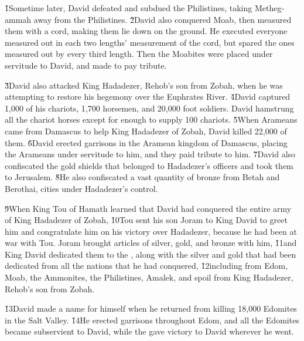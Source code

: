 \v{1}Sometime later, David defeated and subdued the Philistines, taking Metheg-ammah away from the Philistines. \v{2}David also conquered Moab, then measured them with a cord, making them lie down on the ground. He executed everyone measured out in each two lengths' measurement of the cord, but spared the ones measured out by every third length. Then the Moabites were placed under servitude to David, and made to pay tribute.

\v{3}David also attacked King Hadadezer, Rehob's son from Zobah, when he was attempting to restore his hegemony over the Euphrates River. \v{4}David captured 1,000 of his chariots, 1,700 horsemen, and 20,000 foot soldiers. David hamstrung all the chariot horses except for enough to supply 100 chariots. \v{5}When Arameans came from Damascus to help King Hadadezer of Zobah, David killed 22,000 of them. \v{6}David erected garrisons in the Aramean kingdom of Damascus, placing the Arameans under servitude to him, and they paid tribute to him. \v{7}David also confiscated the gold shields that belonged to Hadadezer's officers and took them to Jerusalem. \v{8}He also confiscated a vast quantity of bronze from Betah and Berothai, cities under Hadadezer's control.

\v{9}When King Tou of Hamath learned that David had conquered the entire army of King Hadadezer of Zobah, \v{10}Tou sent his son Joram to King David to greet him and congratulate him on his victory over Hadadezer, because he had been at war with Tou. Joram brought articles of silver, gold, and bronze with him, \v{11}and King David dedicated them to the , along with the silver and gold that had been dedicated from all the nations that he had conquered, \v{12}including from Edom, Moab, the Ammonites, the Philistines, Amalek, and spoil from King Hadadezer, Rehob's son from Zobah.

\v{13}David made a name for himself when he returned from killing 18,000 Edomites in the Salt Valley. \v{14}He erected garrisons throughout Edom, and all the Edomites became subservient to David, while the  gave victory to David wherever he went.


